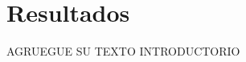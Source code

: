 \section{Resultados}

AGRUEGUE SU TEXTO INTRODUCTORIO



\newpage



\newpage



\newpage



\newpage